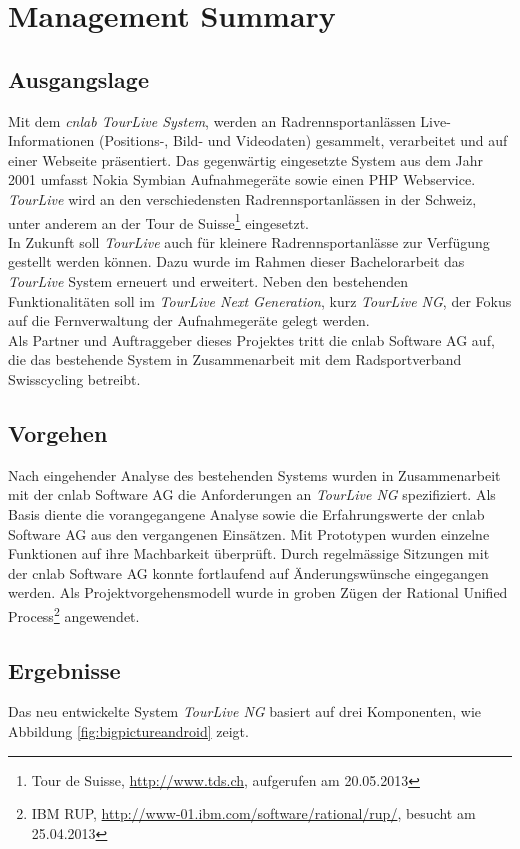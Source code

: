\chapter*{Management Summary}
\section*{Ausgangslage}

Mit dem \textit{cnlab TourLive System}, werden an Radrennsportanlässen Live- Informationen (Positions-, Bild- und Videodaten) gesammelt, verarbeitet und auf einer Webseite präsentiert. Das gegenwärtig eingesetzte System aus dem Jahr 2001  umfasst Nokia Symbian Aufnahmegeräte sowie einen PHP Webservice. \textit{TourLive} wird an den verschiedensten Radrennsportanlässen in der Schweiz, unter anderem an der Tour de Suisse\footnote{Tour de Suisse, \url{http://www.tds.ch}, aufgerufen am 20.05.2013} eingesetzt. 
\\

In Zukunft soll \textit{TourLive} auch für kleinere Radrennsportanlässe zur Verfügung gestellt werden können. Dazu wurde im Rahmen dieser Bachelorarbeit das \textit{TourLive} System erneuert und erweitert. Neben den bestehenden Funktionalitäten soll im \textit{TourLive Next Generation}, kurz \textit{TourLive NG}, der Fokus auf die Fernverwaltung der Aufnahmegeräte gelegt werden. 
\\

Als Partner und Auftraggeber dieses Projektes tritt die cnlab Software AG auf, die das bestehende System in Zusammenarbeit mit dem Radsportverband Swisscycling betreibt.

\section*{Vorgehen}
Nach eingehender Analyse des bestehenden Systems wurden in Zusammenarbeit mit der cnlab Software AG die Anforderungen an \textit{TourLive NG} spezifiziert. Als Basis diente die vorangegangene Analyse sowie die  Erfahrungswerte der cnlab Software AG aus den vergangenen Einsätzen. Mit Prototypen wurden einzelne Funktionen auf ihre Machbarkeit überprüft. Durch regelmässige Sitzungen mit der cnlab Software AG konnte fortlaufend auf Änderungswünsche eingegangen werden. Als Projektvorgehensmodell wurde in groben Zügen der Rational Unified Process\footnote{IBM RUP, \url{http://www-01.ibm.com/software/rational/rup/}, besucht am 25.04.2013} angewendet.
\newpage 

\section*{Ergebnisse}
Das neu entwickelte System \textit{TourLive NG} basiert auf drei Komponenten, wie Abbildung \ref{fig:bigpictureandroid} zeigt.

